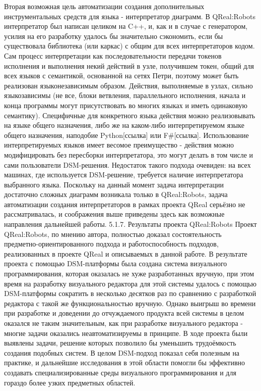 Вторая возможная цель автоматизации создания дополнительных инструментальных средств для языка - интерпретатор диаграмм. В QReal:Robots интерпретатор был написан целиком на C++, и, как и в случае с генератором,  усилия на его разработку удалось бы значительно сэкономить, если бы существовала библиотека (или каркас) с общим для всех интерпретаторов кодом. Сам процесс интерпретации как последовательности передачи токенов исполнения и выполнения некий действий в узле, получившем токен, общий для всех языков с семантикой, основанной на сетях Петри, поэтому может быть реализован языконезависимым образом. Действия, выполняемые в узлах, сильно языкозависимы (не все, блоки ветвления, параллельного исполнения, начала и конца программы могут присутствовать во многих языках и иметь одинаковую семантику). Специфичные для конкретного языка действия можно реализовывать на языке общего назначения, либо же на каком-либо интерпретируемом языке общего назначения, наподобие Python[ссылка] или F#[ссылка]. Использование интерпретируемых языков имеет весомое преимущество - действия можно модифицировать без пересборки интерпретатора, это могут делать в том числе и сами пользователи DSM-решения. Недостаток такого подхода очевиден: на всех машинах, где используется DSM-решение, требуется наличие интерпретатора выбранного языка. Поскольку на данный момент задача интерпретации достаточно сложных диаграмм возникала только в QReal:Robots, задача автоматизации создания интерпретаторов в рамках проекта QReal серьёзно не рассматривалась, и соображения выше приведены здесь как возможные направления дальнейшей работы.
5.1.7. Результаты проекта QReal:Robots
	Проект QReal:Robots, по мнению автора, полностью доказал состоятельность предметно-ориентированного подхода и работоспособность подходов, реализованных в проекте QReal и описываемых в данной работе. В результате проекта с помощью DSM-платформы была создана система визуального программирования, которая оказалась не хуже разработанных вручную, при этом время на разработку визуального редактора для этой системы удалось с помощью DSM-платформы сократить в несколько десятков раз по сравнению с разработкой редактора с такой же функциональностью вручную. Однако выигрыш во времени при разработке и доведении до отчуждаемого продукта всей системы в целом оказался не таким значительным, как при разработке визуального редактора - многие задачи оказались неавтоматизируемы в принципе. В ходе проекта были выявлены задачи, решение которых позволило бы уменьшить трудоёмкость создания подобных систем. В целом DSM-подход показал себя полезным на практике, и дальнейшие исследования в этой области помогли бы эффективно создавать специализированные среды визуального программирования и для гораздо более узких предметных областей.
